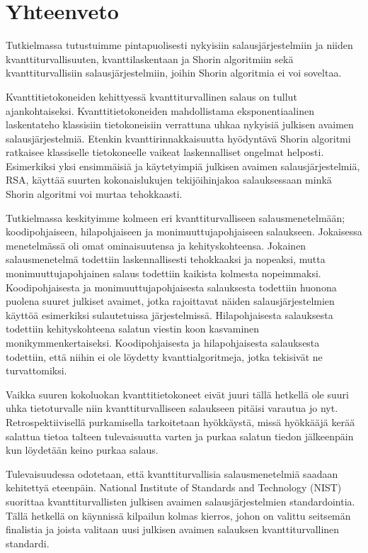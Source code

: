 \chapter{Yhteenveto\label{conclusions}}

Tutkielmassa tutustuimme pintapuolisesti nykyisiin salausjärjestelmiin ja niiden kvanttiturvallisuuten, kvanttilaskentaan ja Shorin algoritmiin sekä kvanttiturvallisiin salausjärjestelmiin, joihin Shorin algoritmia ei voi soveltaa.

Kvanttitietokoneiden kehittyessä kvanttiturvallinen salaus on tullut ajankohtaiseksi. Kvanttitietokoneiden mahdollistama eksponentiaalinen laskentateho klassisiin tietokoneisiin verrattuna uhkaa nykyisiä julkisen avaimen salausjärjestelmiä. Etenkin kvanttirinnakkaisuutta hyödyntävä Shorin algoritmi ratkaisee klassiselle tietokoneelle vaikeat laskennalliset ongelmat helposti. Esimerkiksi yksi ensimmäisiä ja käytetyimpiä julkisen avaimen salausjärjestelmiä, RSA, käyttää suurten kokonaislukujen tekijöihinjakoa salauksessaan minkä Shorin algoritmi voi murtaa tehokkaasti.

Tutkielmassa keskityimme kolmeen eri kvanttiturvalliseen salausmenetelmään; koodipohjaiseen, hilapohjaiseen ja monimuuttujapohjaiseen salaukseen. Jokaisessa menetelmässä oli omat ominaisuutensa ja kehityskohteensa. Jokainen salausmenetelmä todettiin laskennallisesti tehokkaaksi ja nopeaksi, mutta monimuuttujapohjainen salaus todettiin kaikista kolmesta nopeimmaksi. Koodipohjaisesta ja monimuuttujapohjaisesta salauksesta todettiin huonona puolena suuret julkiset avaimet, jotka rajoittavat näiden salausjärjestelmien käyttöä esimerkiksi sulautetuissa järjestelmissä. Hilapohjaisesta salauksesta todettiin kehityskohteena salatun viestin koon kasvaminen monikymmenkertaiseksi. Koodipohjaisesta ja hilapohjaisesta salauksesta todettiin, että niihin ei ole löydetty kvanttialgoritmeja, jotka tekisivät ne turvattomiksi.

Vaikka suuren kokoluokan kvanttitietokoneet eivät juuri tällä hetkellä ole suuri uhka tietoturvalle niin kvanttiturvalliseen salaukseen pitäisi varautua jo nyt. Retrospektiivisellä purkamisella tarkoitetaan hyökkäystä, missä hyökkääjä kerää salattua tietoa talteen tulevaisuutta varten ja purkaa salatun tiedon jälkeenpäin kun löydetään keino purkaa salaus.

Tulevaisuudessa odotetaan, että kvanttiturvallisia salausmenetelmiä saadaan kehitettyä eteenpäin. National Institute of Standards and Technology (NIST) suorittaa kvanttiturvallisten julkisen avaimen salausjärjestelmien standardointia. Tällä hetkellä on käynnissä kilpailun kolmas kierros, johon on valittu seitsemän finalistia ja joista valitaan uusi julkisen avaimen salauksen kvanttiturvallinen standardi.